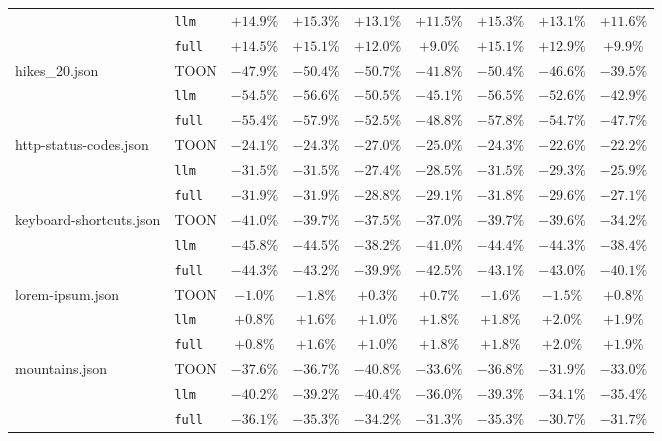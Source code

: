 \begin{table}[t]
\begin{tabular}{@{}llccccccc@{}}
     & \texttt{llm} & $+14.9\%$ & $+15.3\%$ & $+13.1\%$ & $+11.5\%$ & $+15.3\%$ & $+13.1\%$ & $+11.6\%$ \\
     & \texttt{full} & $+14.5\%$ & $+15.1\%$ & $+12.0\%$ & $+9.0\%$ & $+15.1\%$ & $+12.9\%$ & $+9.9\%$ \\
    \cline{2-9}
    \multirow{3}{*}{hikes\_20.json} & TOON & $-47.9\%$ & $-50.4\%$ & $-50.7\%$ & $-41.8\%$ & $-50.4\%$ & $-46.6\%$ & $-39.5\%$ \\
     & \texttt{llm} & $-54.5\%$ & $-56.6\%$ & $-50.5\%$ & $-45.1\%$ & $-56.5\%$ & $-52.6\%$ & $-42.9\%$ \\
     & \texttt{full} & $-55.4\%$ & $-57.9\%$ & $-52.5\%$ & $-48.8\%$ & $-57.8\%$ & $-54.7\%$ & $-47.7\%$ \\
    \cline{2-9}
    \multirow{3}{*}{http-status-codes.json} & TOON & $-24.1\%$ & $-24.3\%$ & $-27.0\%$ & $-25.0\%$ & $-24.3\%$ & $-22.6\%$ & $-22.2\%$ \\
     & \texttt{llm} & $-31.5\%$ & $-31.5\%$ & $-27.4\%$ & $-28.5\%$ & $-31.5\%$ & $-29.3\%$ & $-25.9\%$ \\
     & \texttt{full} & $-31.9\%$ & $-31.9\%$ & $-28.8\%$ & $-29.1\%$ & $-31.8\%$ & $-29.6\%$ & $-27.1\%$ \\
    \cline{2-9}
    \multirow{3}{*}{keyboard-shortcuts.json} & TOON & $-41.0\%$ & $-39.7\%$ & $-37.5\%$ & $-37.0\%$ & $-39.7\%$ & $-39.6\%$ & $-34.2\%$ \\
     & \texttt{llm} & $-45.8\%$ & $-44.5\%$ & $-38.2\%$ & $-41.0\%$ & $-44.4\%$ & $-44.3\%$ & $-38.4\%$ \\
     & \texttt{full} & $-44.3\%$ & $-43.2\%$ & $-39.9\%$ & $-42.5\%$ & $-43.1\%$ & $-43.0\%$ & $-40.1\%$ \\
    \cline{2-9}
    \multirow{3}{*}{lorem-ipsum.json} & TOON & $-1.0\%$ & $-1.8\%$ & $+0.3\%$ & $+0.7\%$ & $-1.6\%$ & $-1.5\%$ & $+0.8\%$ \\
     & \texttt{llm} & $+0.8\%$ & $+1.6\%$ & $+1.0\%$ & $+1.8\%$ & $+1.8\%$ & $+2.0\%$ & $+1.9\%$ \\
     & \texttt{full} & $+0.8\%$ & $+1.6\%$ & $+1.0\%$ & $+1.8\%$ & $+1.8\%$ & $+2.0\%$ & $+1.9\%$ \\
    \cline{2-9}
    \multirow{3}{*}{mountains.json} & TOON & $-37.6\%$ & $-36.7\%$ & $-40.8\%$ & $-33.6\%$ & $-36.8\%$ & $-31.9\%$ & $-33.0\%$ \\
     & \texttt{llm} & $-40.2\%$ & $-39.2\%$ & $-40.4\%$ & $-36.0\%$ & $-39.3\%$ & $-34.1\%$ & $-35.4\%$ \\
     & \texttt{full} & $-36.1\%$ & $-35.3\%$ & $-34.2\%$ & $-31.3\%$ & $-35.3\%$ & $-30.7\%$ & $-31.7\%$ \\

\end{tabular}
\end{table}
